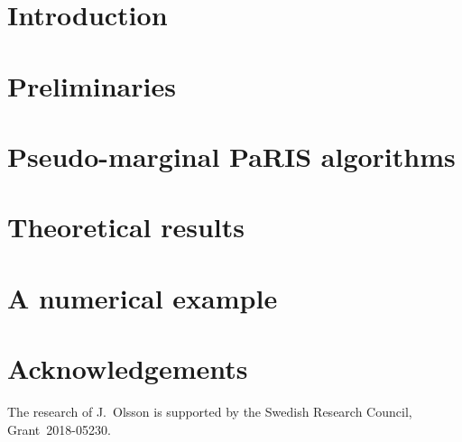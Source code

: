 \documentclass[bj]{imsart}
\numberwithin{equation}{section}
\theoremstyle{remark}
\begin{document}
\section{Introduction}
\label{sec:introduction}


\section{Preliminaries}
\label{sec:preliminaries}


\section{Pseudo-marginal PaRIS algorithms}
\label{sec:pseudo:marginal:PaRIS}


\section{Theoretical results}
\label{sec:theoretical:results}


\section{A numerical example}
\label{sec:numerical:results}



\section*{Acknowledgements}

The research of J.~Olsson is supported by the Swedish Research Council, Grant~2018-05230.  



\end{document}
